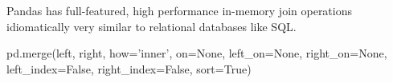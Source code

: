 \documentclass[11pt]{article}
\newenvironment{Shaded}{}{}
\newcommand{\StringTok}[1]{\textcolor[rgb]{0.25,0.44,0.63}{{#1}}}
\newcommand{\NormalTok}[1]{{#1}}
\newcommand{\VariableTok}[1]{\textcolor[rgb]{0.10,0.09,0.49}{{#1}}}
\newcommand{\OperatorTok}[1]{\textcolor[rgb]{0.40,0.40,0.40}{{#1}}}
\begin{document}
Pandas has full-featured, high performance in-memory join operations
idiomatically very similar to relational databases like SQL.

\begin{Shaded}
\begin{Highlighting}[]
\NormalTok{pd.merge(left, right, how}\OperatorTok{=}\StringTok{'inner'}\NormalTok{, on}\OperatorTok{=}\VariableTok{None}\NormalTok{, left_on}\OperatorTok{=}\VariableTok{None}\NormalTok{, right_on}\OperatorTok{=}\VariableTok{None}\NormalTok{,}
\NormalTok{    left_index}\OperatorTok{=}\VariableTok{False}\NormalTok{, right_index}\OperatorTok{=}\VariableTok{False}\NormalTok{, sort}\OperatorTok{=}\VariableTok{True}\NormalTok{)}
\end{Highlighting}
\end{Shaded}
\end{document}
